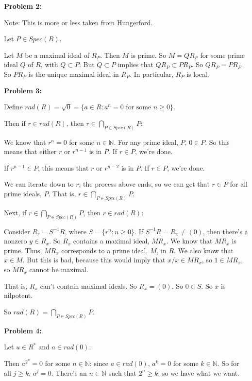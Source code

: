 \documentclass[a4paper,12pt]{article}
\newcommand{\tab}{\hspace{4mm}} %
\newcommand{\shunt}{\vspace{20mm}}
\newcommand{\N}{\mathbb{N}}
\begin{document}
\shunt

{\bf Problem 2:}

Note: This is more or less taken from Hungerford.

Let $P \in Spec(R)$.

Let $M$ be a maximal ideal of $R_P$. Then $M$ is prime. So $M = QR_P$ for some prime ideal $Q$ of $R$, with $Q \subset P$. But $Q \subset P$ implies that $QR_P \subset PR_P$. So $QR_P = PR_P$ So $PR_P$ is the unique maximal ideal in $R_P$. In particular, $R_P$ is local.

\shunt

{\bf Problem 3:}

Define $rad(R) = \sqrt{0} = \{a \in R: a^n = 0 \text{ for some } n \geq 0\}$.

Then if $r \in rad(R)$, then $r \in \bigcap\limits_{P \in Spec(R)} P$:

\tab We know that $r^n=0$ for some $n \in \N$. For any prime ideal, $P$, $0 \in P$. So this means that either $r$ or $r^{n-1}$ is in $P$. If $r \in P$, we're done.

\tab If $r^{n-1} \in P$, this means that $r$ or $r^{n-2}$ is in $P$. If $r \in P$, we're done.

\tab We can iterate down to $r$; the process above ends, so we can get that $r \in P$ for all prime ideals, $P$. That is, $r \in \bigcap\limits_{P \in Spec(R)} P$.

Next, if $r \in \bigcap\limits_{P \in Spec(R)} P$, then $r \in rad(R)$:

\tab Consider $R_r = S^{-1}R$, where $S = \{r^n: n \geq 0\}$. If $S^{-1}R = R_x \neq (0)$, then there's a nonzero $y \in R_x$. So $R_x$ contains a maximal ideal, $MR_x$. We know that $MR_x$ is prime. Thus, $MR_x$ corresponds to a prime ideal, $M$, in $R$. We also know that $x \in M$. But this is bad, because this would imply that $x/x \in MR_x$, so $1 \in MR_x$, so $MR_x$ cannot be maximal.

\tab That is, $R_x$ can't contain maximal ideals. So $R_x = (0)$. So $0 \in S$. So $x$ is nilpotent.

So $rad(R) = \bigcap\limits_{P \in Spec(R)} P$.

\shunt

{\bf Problem 4:}

Let $u \in R^*$ and $a \in rad(0)$.

Then $a^{2^n} = 0$ for some $n \in \N$: since $a \in rad(0)$, $a^k = 0$ for some $k \in \N$. So for all $j \geq k$, $a^j = 0$. There's an $n \in \N$ such that $2^n \geq k$, so we have what we want.
\end{document}
